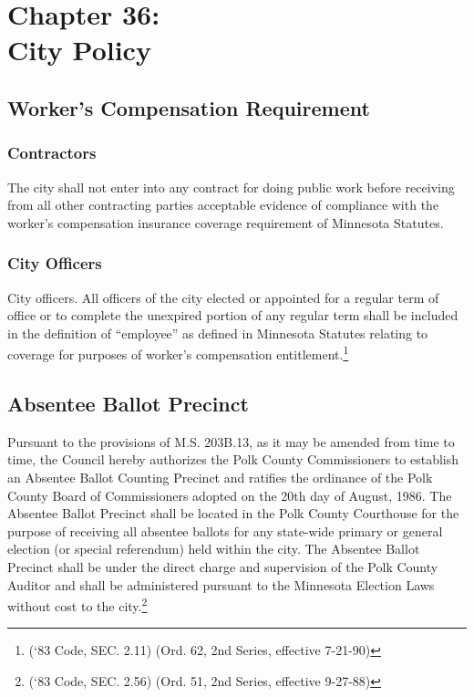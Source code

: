 \chapter*{Chapter 36: \\
	City Policy}
    \vfill
    \minitoc
    \pagebreak
    
\section{Worker's Compensation Requirement}
\subsection{Contractors}
The city shall not enter into any contract for doing public work before receiving from all other contracting parties acceptable evidence of compliance with the worker’s compensation insurance coverage requirement of Minnesota Statutes.
\subsection{City Officers}
City officers.  All officers of the city elected or appointed for a regular term of office or to complete the unexpired portion of any regular term shall be included in the definition of “employee” as defined in Minnesota Statutes relating to coverage for purposes of worker’s compensation entitlement.\footnote{(‘83 Code, SEC. 2.11)  (Ord. 62, 2nd Series, effective 7-21-90)}

\section{Absentee Ballot Precinct}
Pursuant to the provisions of M.S. \textsection 203B.13, as it may be amended from time to time, the Council hereby authorizes the Polk County Commissioners to establish an Absentee Ballot Counting Precinct and ratifies the ordinance of the Polk County Board of Commissioners adopted on the 20th day of August, 1986.  The Absentee Ballot Precinct shall be located in the Polk County Courthouse for the purpose of receiving all absentee ballots for any state-wide primary or general election (or special referendum) held within the city.  The Absentee Ballot Precinct shall be under the direct charge and supervision of the Polk County Auditor and shall be administered pursuant to the Minnesota Election Laws without cost to the city.\footnote{(‘83 Code, SEC. 2.56)  (Ord. 51, 2nd Series, effective 9-27-88)}

